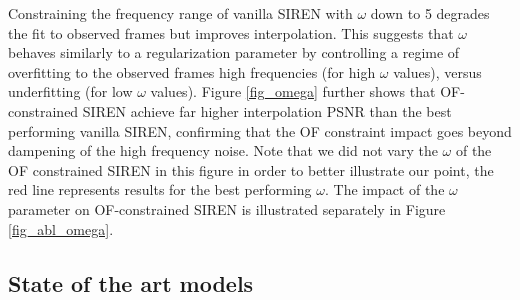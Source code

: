 \documentclass{article}
\begin{document}
Constraining the frequency range of vanilla SIREN with $\omega$ down to 5 degrades the fit to observed frames but improves interpolation.
This suggests that $\omega$ behaves similarly to a regularization parameter by
controlling a regime of overfitting to the observed frames high frequencies (for high $\omega$ values),
versus underfitting (for low $\omega$ values).
Figure \ref{fig_omega} further shows that OF-constrained SIREN achieve far higher interpolation PSNR than
the best performing vanilla SIREN, confirming that the OF constraint impact goes beyond dampening of the high frequency noise.
Note that we did not vary the $\omega$ of the OF constrained SIREN in this figure in order to better illustrate our point,
the red line represents results for the best performing $\omega$.
The impact of the $\omega$ parameter on OF-constrained SIREN is illustrated separately in Figure \ref{fig_abl_omega}.

\subsection{State of the art models}
\label{sec_sota}
\end{document}
